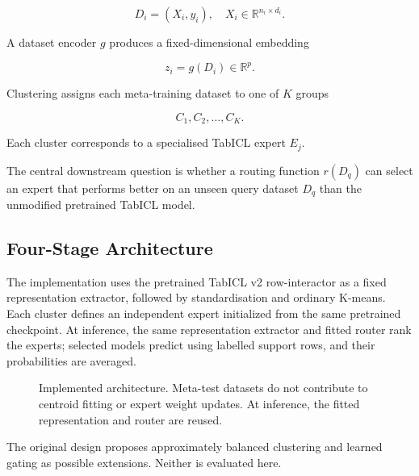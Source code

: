 \documentclass[conference]{IEEEtran}
\begin{document}
\begin{equation}
D_i=(X_i,y_i),
\quad X_i\in\mathbb{R}^{n_i\times d_i}.
\end{equation}

A dataset encoder $g$ produces a fixed-dimensional embedding

\begin{equation}
z_i=g(D_i)\in\mathbb{R}^{p}.
\end{equation}

Clustering assigns each meta-training dataset to one of $K$ groups

\begin{equation}
C_1,C_2,\ldots,C_K.
\end{equation}

Each cluster corresponds to a specialised TabICL expert $E_j$.

The central downstream question is whether a routing function $r(D_q)$ can select an expert that performs better on an unseen query dataset $D_q$ than the unmodified pretrained TabICL model.

\subsection{Four-Stage Architecture}
The implementation uses the pretrained TabICL v2 row-interactor as a fixed representation extractor, followed by standardisation and ordinary K-means. Each cluster defines an independent expert initialized from the same pretrained checkpoint. At inference, the same representation extractor and fitted router rank the experts; selected models predict using labelled support rows, and their probabilities are averaged.
\begin{figure}[t]
\centering
{}
\caption{Implemented architecture. Meta-test datasets do not contribute to centroid fitting or expert weight updates. At inference, the fitted representation and router are reused.}
\label{fig:architecture}
\end{figure}
The original design proposes approximately balanced clustering and learned gating as possible extensions. Neither is evaluated here.
\end{document}
